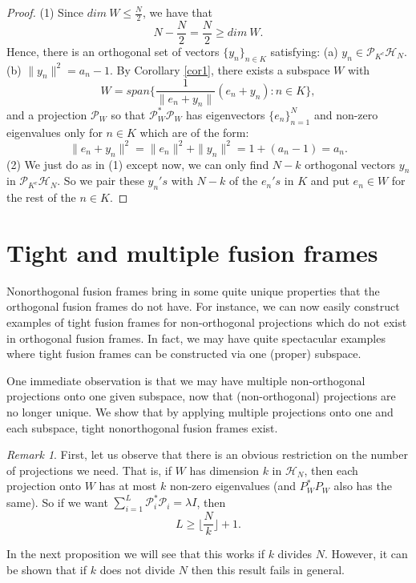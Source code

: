 \documentclass[11pt,reqno]{amsart}
\theoremstyle{remark}
\newtheorem{remark}[thm]{Remark}
\begin{document}
\begin{proof}(1)
Since $dim\ W \le \frac{N}{2}$, we have that
\[ N - \frac{N}{2}= \frac{N}{2} \ge dim\  W.\]
Hence, there is an orthogonal set of vectors $\{y_n\}_{n\in K}$ satisfying:
\vskip12pt
(a)    $y_n \in {\mathcal P}_{K^c}{\mathcal H}_N$.
\vskip12pt
(b)  $\|y_n\|^2 = a_n-1$.
\vskip12pt
By Corollary \ref{cor1}, there exists a subspace $W$ with
\[ W = span \{\frac{1}{\|e_n+y_n\|}\left ( e_n+y_n \right):n\in K\},\]
and a projection ${\mathcal P}_W$
so that ${\mathcal P}_W^{*}{\mathcal P}_W$ has eigenvectors $\{e_n\}_{n=1}^N$ and non-zero eigenvalues
only for $n\in K$ which are of the form:
\[ \|e_n+y_n\|^2 = \|e_n\|^2 + \|y_n\|^2 = 1+ (a_n-1) = a_n.\]
\vskip12pt
(2) We just do as in (1) except now, we can only find $N-k$ orthogonal vectors
$y_n$ in ${\mathcal P}_{K^c}{\mathcal H}_N$.  So we pair these $y_n's$ with $N-k$ of the $e_n's$
in $K$ and put $e_n\in W$ for the rest of the $n\in K$.
\end{proof}

\section{Tight and multiple fusion frames}

Nonorthogonal fusion frames bring in some
quite unique
 properties that the orthogonal fusion frames do not have.   For instance, we can now easily construct examples of tight fusion frames for non-orthogonal projections which do not exist in orthogonal fusion frames.  In fact, we may have
quite spectacular examples where tight fusion frames can be constructed via one (proper) subspace.

One immediate observation is that we may have multiple non-orthogonal projections onto one given subspace, now that (non-orthogonal) projections are no longer unique.  We show that by applying multiple projections onto one and each subspace, tight nonorthogonal fusion frames exist.

\begin{remark}  First, let us observe that there is an obvious restriction on the number of projections we need.  That is, if $W$ has dimension $k$ in ${\mathcal H}_N$, then each projection onto $W$ has at most $k$ non-zero eigenvalues (and $P_W^*P_W$ also
has the same).  So if we want $\sum_{i=1}^{L} {\mathcal P}_i^{*}{\mathcal P}_i = \lambda I$, then
\[ L \ge \lfloor \frac{N}{k}\rfloor +1.\]

In the next proposition we will see that this works if
$k$ divides $N$.  However, it can be shown that if $k$ does not divide $N$
then this result fails in general.
\end{remark}
\end{document}
